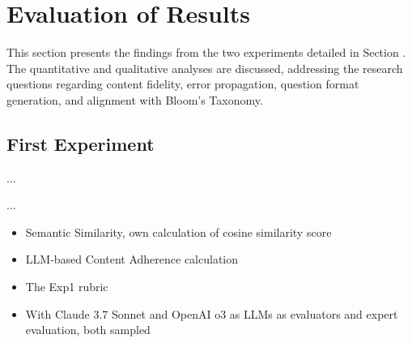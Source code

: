 \section{Evaluation of Results} \label{sec:evaluation}

This section presents the findings from the two experiments detailed in Section . The quantitative and qualitative analyses are discussed, addressing the research questions regarding content fidelity, error propagation, question format generation, and alignment with Bloom's Taxonomy.


\subsection{First Experiment}
\label{sec:first-experiment}

 ...




...


\begin{itemize}
    \item Semantic Similarity, own calculation of cosine similarity score
    \item LLM-based Content Adherence calculation
\end{itemize}


\begin{itemize}
    \item The Exp1 rubric
    \item With Claude 3.7 Sonnet and OpenAI o3 as LLMs as evaluators and expert evaluation, both sampled
\end{itemize}

